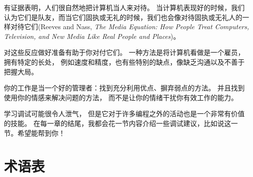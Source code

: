 有证据表明，人们很自然地把计算机当人来对待。
当计算机表现好的时候，我们认为它们是队友，而当它们固执或无礼的时候，我们也会像对待固执或无礼人的一样对待它们(Reeves and Nass, {\it The Media Equation: How People Treat Computers, Television, and New Media Like Real People and Places})。
  
  


对这些反应做好准备有助于你对付它们。 一种方法是将计算机看做是一个雇员，拥有特定的长处， 例如速度和精度，也有些特别的缺点，像缺乏沟通以及不善于把握大局。


你的工作是当一个好的管理者：找到充分利用优点、摒弃弱点的方法。 并且找到使用你的情感来解决问题的方法， 而不是让你的情绪干扰你有效工作的能力。


学习调试可能很令人泄气， 但是它对于许多编程之外的活动也是一个非常有价值的技能。 在每一章的结尾，我都会花一节内容介绍一些调试建议，比如说这一节。希望能帮到你！

\section{术语表}

